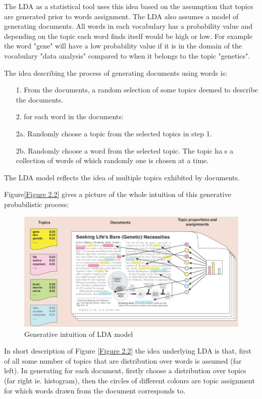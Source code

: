 The LDA as a statistical tool uses this idea based on the assumption that topics are generated prior to words assignment. The LDA also assumes a model of generating documents. All words in each vocabulary has a probability value and depending on the topic each word finds itself would be high or low. For example the word "gene" will have a low probability value if it is in the domain of the  vocabulary "data analysis" compared to when it belongs to the topic "genetics". 

The idea describing the process of generating documents using words is:
\begin{itemize}
\item[1.] From the documents, a random selection of some topics deemed to describe the documents.
\item[2.] for each word in the documents:
		\item[2a.]Randomly choose a topic from
the selected topics in step 1.
		\item[2b.]Randomly choose a word from the selected topic. The topic ha s a collection of words of which randomly one is chosen at a time. 
\end{itemize}
The LDA model reflects the idea of multiple topics exhibited by documents.

Figure\eqref{Figure 2.2}  gives a picture of the whole intuition of this generative probabilistic process:

\begin{figure}[hbtp]
\centering
\includegraphics[scale=0.5]{DLA.png}
\caption{Generative intuition of LDA model}\label{Figure 2.1}
\end{figure}
In short description of Figure \eqref{Figure 2.2} the idea underlying LDA is that, first of all some number of topics that are distribution over words is assumed (far left). In generating for each document, firstly choose a distribution over topics (far right ie. histogram), then the circles of different colours are topic assignment for which words drawn from the document corresponds to.


